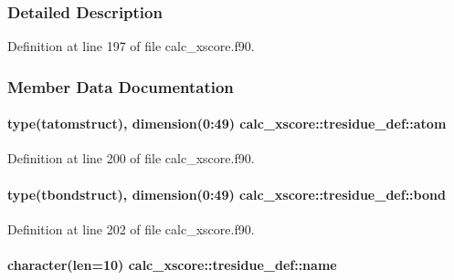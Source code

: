 \subsubsection{Detailed Description}


Definition at line 197 of file calc\-\_\-xscore.\-f90.



\subsubsection{Member Data Documentation}
\hypertarget{structcalc__xscore_1_1tresidue__def_a7b9f128e97673abf781c5ad5f8f42fa7}{
\paragraph[{atom}]{\setlength{\rightskip}{0pt plus 5cm}type({\bf tatomstruct}), dimension(0\-:49) calc\-\_\-xscore\-::tresidue\-\_\-def\-::atom}}\label{structcalc__xscore_1_1tresidue__def_a7b9f128e97673abf781c5ad5f8f42fa7}


Definition at line 200 of file calc\-\_\-xscore.\-f90.

\hypertarget{structcalc__xscore_1_1tresidue__def_a4406a96ef4c74040c5780112ace7e998}{
\paragraph[{bond}]{\setlength{\rightskip}{0pt plus 5cm}type({\bf tbondstruct}), dimension(0\-:49) calc\-\_\-xscore\-::tresidue\-\_\-def\-::bond}}\label{structcalc__xscore_1_1tresidue__def_a4406a96ef4c74040c5780112ace7e998}


Definition at line 202 of file calc\-\_\-xscore.\-f90.

\hypertarget{structcalc__xscore_1_1tresidue__def_af8eaa149eb978198ac39c417bb57dc41}{
\paragraph[{name}]{\setlength{\rightskip}{0pt plus 5cm}character(len=10) calc\-\_\-xscore\-::tresidue\-\_\-def\-::name}}\label{structcalc__xscore_1_1tresidue__def_af8eaa149eb978198ac39c417bb57dc41}


